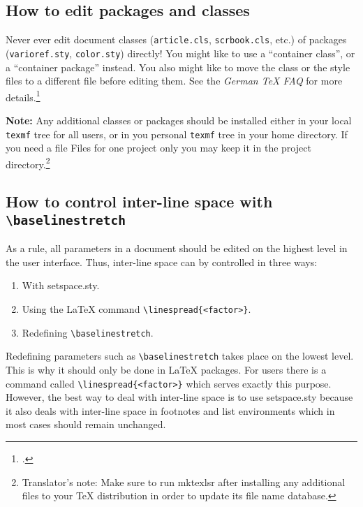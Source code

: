 \documentclass[abstract=on, singlepage=on, paper=a4]{scrartcl}
\newcommand{\Command}[1]{\texttt{\textbackslash{}#1}}
\newcommand{\Doku}[1]{\emph{#1}}
\newcommand{\File}[1]{\texttt{#1}}
\newcommand{\Package}[1]{\textsf{#1}}
\newcommand{\Programme}[1]{\textsf{#1}}
\begin{document}
\subsection{How to edit packages and classes}
\label{sec:edit-pack-class}

Never ever edit document classes (\File{article.cls},
\File{scrbook.cls}, etc.) of packages (\File{varioref.sty},
\File{color.sty}) directly! You might like to use a \enquote{container
  class}, or a \enquote{container package} instead. You also might
like to move the class or the style files to a different file before
editing them. See the \Doku{German \TeX{} FAQ} for more
details.\footcite{voss_wie_2009}

\medskip\noindent\textbf{Note:} Any additional classes or packages
should be installed either in your local \File{texmf} tree for all
users, or in you personal \File{texmf} tree in your home directory.
If you need a file Files for one project only you may keep it in the
project directory.\footnote{Translator's note: Make sure to run
  \Programme{mktexlsr} after installing any additional files to your
  \TeX{} distribution in order to update its file name database.}

\subsection{How to control inter-line space with
  \Command{baselinestretch}}
\label{sec:control-inter-line}

As a rule, all parameters in a document should be edited on the
highest level in the user interface. Thus, inter-line space can by
controlled in three ways:
\begin{enumerate}
\item With \Package{setspace.sty}.
\item Using the \LaTeX{} command \Command{linespread\{<factor>\}}.
\item Redefining \Command{baselinestretch}.
\end{enumerate}

Redefining parameters such as \Command{baselinestretch} takes place on
the lowest level. This is why it should only be done in \LaTeX{}
packages. For users there is a command called
\Command{linespread\{<factor>\}} which serves exactly this
purpose. However, the best way to deal with inter-line space is to use
\Package{setspace.sty} because it also deals with inter-line space in
footnotes and list environments which in most cases should remain
unchanged.
\end{document}
